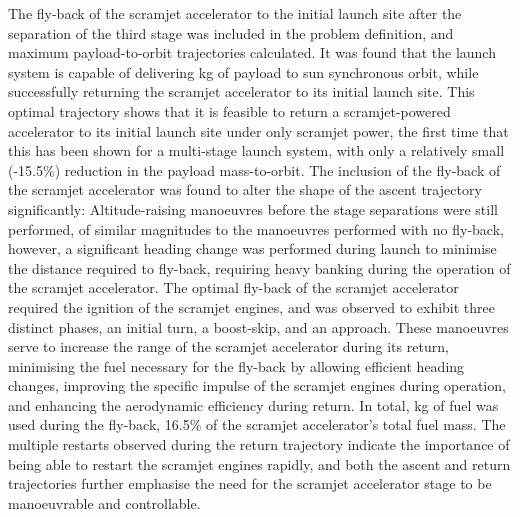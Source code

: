 The fly-back of the scramjet accelerator to the initial launch site after the separation of the third stage was included in the problem definition, and maximum payload-to-orbit trajectories calculated. 
It was found that the launch system is capable of delivering \PayloadToOrbitStandard kg of payload to sun synchronous orbit, while successfully returning the scramjet accelerator to its initial launch site. This optimal trajectory shows that it is feasible to return a scramjet-powered accelerator to its initial launch site under only scramjet power, the first time that this has been shown for a multi-stage launch system, with only a relatively small (-15.5\%) reduction in the payload mass-to-orbit.
	The inclusion of the fly-back of the scramjet accelerator was found to alter the shape of the ascent trajectory significantly: Altitude-raising manoeuvres before the stage separations were still performed, of similar magnitudes to the manoeuvres performed with no fly-back, however, a significant heading change was performed during launch to minimise the distance required to fly-back, requiring heavy banking during the operation of the scramjet accelerator. 
The optimal fly-back of the scramjet accelerator required the ignition of the scramjet engines, and was observed to exhibit three distinct phases, an initial turn, a boost-skip, and an approach. 
These manoeuvres serve to increase the range of the scramjet accelerator during its return, minimising the fuel necessary for the fly-back by allowing efficient heading changes, improving the specific impulse of the scramjet engines during operation, and enhancing the aerodynamic efficiency during return.
 In total, \returnFuelStandard kg of fuel was used during the fly-back, 16.5\% of the scramjet accelerator's total fuel mass. The multiple restarts observed during the return trajectory indicate the importance of being able to restart the scramjet engines rapidly, and both the ascent and return trajectories further emphasise the need for the scramjet accelerator stage to be manoeuvrable and controllable. 
	
	
	
